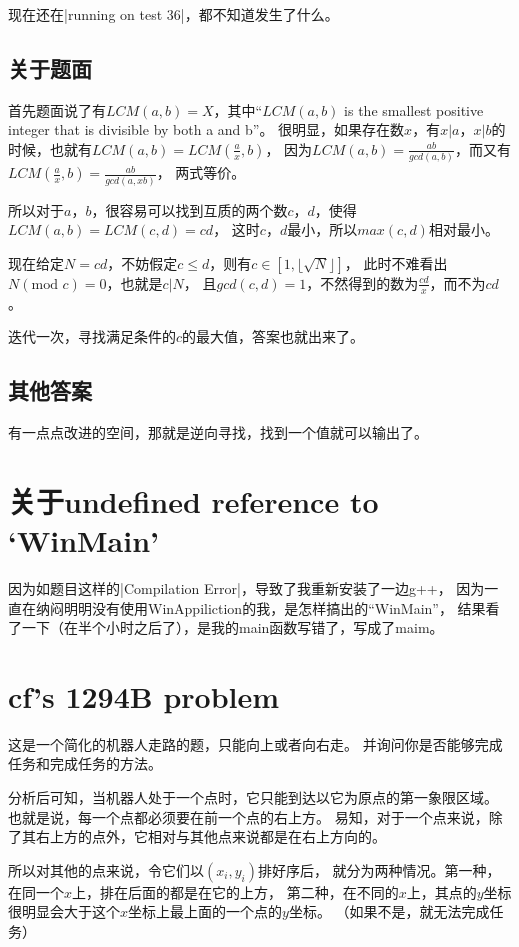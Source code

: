 现在还在\vb|running on test 36|，都不知道发生了什么。

\subsection{关于题面}
首先题面说了有$LCM(a,b)=X$，其中``$LCM(a,b)$ is the smallest positive integer
that is divisible by both a and b''。
很明显，如果存在数$x$，有$x|a$，$x|b$的时候，也就有$LCM(a,b)=LCM(\frac{a}{x},b)$，
因为$LCM(a,b)=\frac{ab}{gcd(a,b)}$，而又有$LCM(\frac{a}{x},b)=\frac{ab}{gcd(a,xb)}$，
两式等价。

所以对于$a$，$b$，很容易可以找到互质的两个数$c$，$d$，使得$LCM(a,b)=LCM(c,d)=cd$，
这时$c$，$d$最小，所以$max(c,d)$相对最小。

现在给定$N=cd$，不妨假定$c\le d$，则有$c\in [1,\lfloor\sqrt{N}\rfloor]$，
此时不难看出$N(\text{mod }c)=0$，也就是$c|N$，
且$gcd(c,d)=1$，不然得到的数为$\frac{cd}{x}$，而不为$cd$。

迭代一次，寻找满足条件的$c$的最大值，答案也就出来了。

\subsection{其他答案}
有一点点改进的空间，那就是逆向寻找，找到一个值就可以输出了。


\section{关于undefined reference to `WinMain'}

因为如题目这样的\vb|Compilation Error|，导致了我重新安装了一边g++，
因为一直在纳闷明明没有使用WinAppiliction的我，是怎样搞出的``WinMain''，
结果看了一下（在半个小时之后了），是我的main函数写错了，写成了maim。


\section{cf's 1294B problem}

这是一个简化的机器人走路的题，只能向上或者向右走。
并询问你是否能够完成任务和完成任务的方法。

分析后可知，当机器人处于一个点时，它只能到达以它为原点的第一象限区域。
也就是说，每一个点都必须要在前一个点的右上方。
易知，对于一个点来说，除了其右上方的点外，它相对与其他点来说都是在右上方向的。

所以对其他的点来说，令它们以$(x_i, y_i)$排好序后，
就分为两种情况。第一种，在同一个$x$上，排在后面的都是在它的上方，
第二种，在不同的$x$上，其点的$y$坐标很明显会大于这个$x$坐标上最上面的一个点的$y$坐标。
（如果不是，就无法完成任务）

